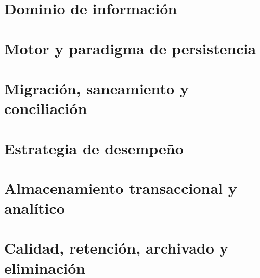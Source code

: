 
\begin{resumenApertura}
\begin{recibe}
  \item {}
\end{recibe}
\end{resumenApertura}

\section{Dominio de información}\label{sec:5-dominio-de-informacion}


\section{Motor y paradigma de persistencia}\label{sec:5-motor-y-paradigma-de-persistenci}


\section{Migración, saneamiento y conciliación}\label{sec:5-migracion-saneamiento-y-concilia}


\section{Estrategia de desempeño}\label{sec:5-estrategia-de-desempeno}


\section{Almacenamiento transaccional y analítico}\label{sec:5-almacenamiento-transaccional-y-a}


\section{Calidad, retención, archivado y eliminación}\label{sec:5-calidad-retencion-archivado-y-el}

